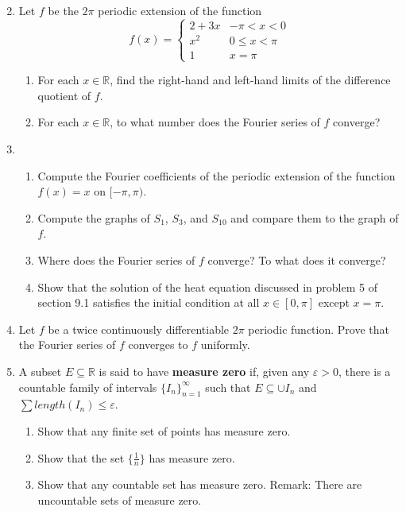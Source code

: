 \documentclass{article}
\begin{document}
\begin{enumerate}
      \setcounter{enumi}{1}
      \item Let $f$ be the $2\pi$ periodic extension of the function
            \[
                  f(x) = \begin{cases}
                        2 + 3x & -\pi < x < 0   \\
                        x^2    & 0 \leq x < \pi \\
                        1      & x = \pi
                  \end{cases}
            \]
            \begin{enumerate}
                  \item For each $x\in\mathbb{R}$, find the right-hand and
                        left-hand limits of the difference quotient of $f$.
                  \item For each $x\in\mathbb{R}$, to what number does the
                        Fourier series of $f$ converge?
            \end{enumerate}
            \setcounter{enumi}{4}
      \item \begin{enumerate}
                  \item Compute the Fourier coefficients of the periodic extension
                        of the function $f(x)=x$ on $[-\pi,\pi)$.
                  \item Compute the graphs of $S_1$, $S_3$, and $S_{10}$ and compare
                        them to the graph of $f$.
                  \item Where does the Fourier series of $f$ converge? To what does
                        it converge?
                  \item Show that the solution of the heat equation discussed in
                        problem 5 of section 9.1 satisfies the initial condition
                        at all $x\in[0,\pi]$ except $x=\pi$.
            \end{enumerate}
            \setcounter{enumi}{6}
      \item Let $f$ be a twice continuously differentiable $2\pi$ periodic
            function. Prove that the Fourier series of $f$ converges to $f$
            uniformly.
            \setcounter{enumi}{9}
      \item A subset $E\subseteq \mathbb{R}$ is said to have \textbf{measure zero}
            if, given any $\varepsilon>0$, there is a countable family of intervals
            $\{I_n\}_{n=1}^\infty$ such that $E\subseteq\cup I_n$ and
            $\sum length(I_n)\leq \varepsilon$.
            \begin{enumerate}
                  \item Show that any finite set of points has measure zero.
                  \item Show that the set $\{\frac{1}{n}\}$ has measure zero.
                  \item Show that any countable set has measure zero. Remark:
                        There are uncountable sets of measure zero.
            \end{enumerate}
\end{enumerate}
\end{document}
